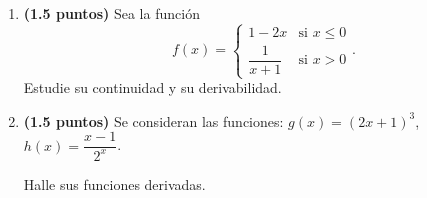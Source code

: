 
\begin{enumerate}[label=\alph*)]
\item \textbf{(1.5 puntos)} Sea la función
\[
f(x)=\begin{cases}1-2x&\text{si }x\leq0\\[0.6em]\dfrac{1}{x+1}&\text{si }x>0\end{cases}.
\]
Estudie su continuidad y su derivabilidad.
\item \textbf{(1.5 puntos)} Se consideran las funciones: $g(x)=(2x+1)^3$, $h(x)=\dfrac{x-1}{2^x}$.

Halle sus funciones derivadas.
\end{enumerate}
